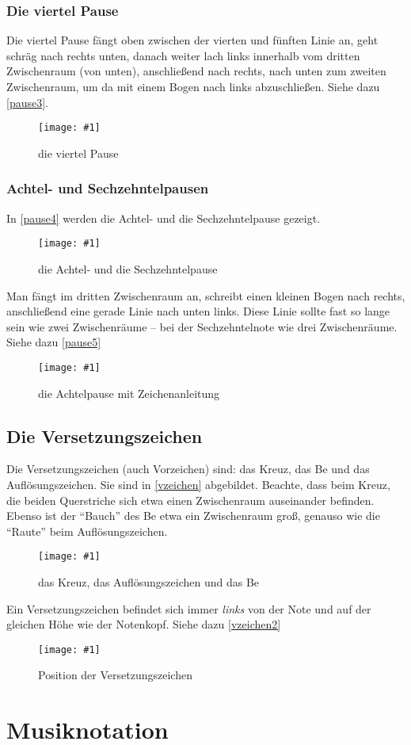 \documentclass[10pt,a4paper,twoside]{report}
\newcommand{\comment}[1]{\marginpar{\begin{flushleft}
            \textsf{#1}
        \end{flushleft}}}
\newcommand{\image}[4]{
	\begin{figure}[!ht]
		\centering
		\texttt{[image: \#1]}
		\caption{#2}
		\label{#3}
	\end{figure}
}
\begin{document}
\subsection{Die viertel Pause}
Die viertel Pause fängt oben zwischen der vierten und fünften Linie an, geht schräg nach rechts unten,
danach weiter lach links innerhalb vom dritten Zwischenraum (von unten), anschließend nach rechts,
nach unten
zum zweiten Zwischenraum, um da mit einem Bogen nach links abzuschließen. 
Siehe dazu \autoref{pause3}. 
\image{img/pausen3c.png}{die viertel Pause}{pause3}{5.5}

\subsection{Achtel- und Sechzehntelpausen}
In \autoref{pause4} werden die Achtel- und die Sechzehntelpause gezeigt.
\image{img/pausen4.png}{die Achtel- und die Sechzehntelpause}
{pause4}{5.5}

Man fängt im dritten Zwischenraum an, schreibt einen kleinen Bogen nach rechts,
anschließend eine gerade Linie nach unten links. Diese Linie sollte fast so lange sein
wie zwei Zwischenräume -- bei der Sechzehntelnote wie drei Zwischenräume. Siehe dazu
\autoref{pause5}
\image{img/pausen5c.png}{die Achtelpause mit Zeichenanleitung}{pause5}{5.5}


\section{Die Versetzungszeichen}
Die Versetzungszeichen (auch Vorzeichen) sind: das Kreuz, 
\comment{Kreuz $\sharp$\\Be $\flat$\\Auflösungszeichen $\natural$}
das Be und das Auflösungszeichen. Sie sind in 
\autoref{vzeichen} abgebildet. Beachte, dass beim Kreuz, die beiden Querstriche
sich etwa einen Zwischenraum auseinander befinden. 
Ebenso ist der "`Bauch"'
des Be etwa ein Zwischenraum groß, genauso wie die "`Raute"' beim 
Auflösungszeichen.
\image{img/vzeichen4.png}{das Kreuz, das Auflösungszeichen und das Be }
{vzeichen}{6}

Ein Versetzungszeichen befindet sich immer \emph{links} von der Note und auf der gleichen Höhe wie der Notenkopf. Siehe dazu \autoref{vzeichen2}
\image{img/vzeichen2.png}{Position der Versetzungszeichen}{vzeichen2}{5}

\chapter{Musiknotation}
\end{document}
